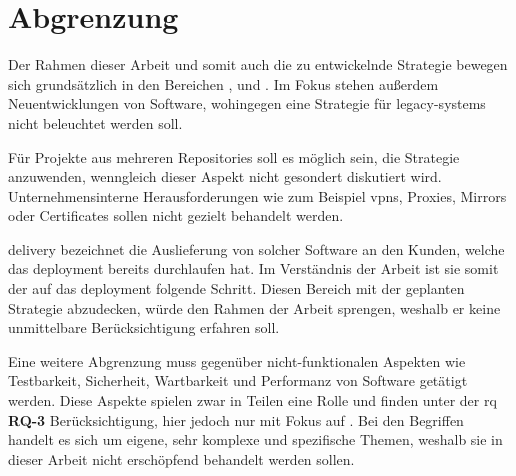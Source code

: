 \section{Abgrenzung}
\label{sec:01-04_demarcation}

Der Rahmen dieser Arbeit und somit auch die zu entwickelnde Strategie bewegen sich grundsätzlich in den Bereichen ,  und . Im Fokus stehen außerdem Neuentwicklungen von Software, wohingegen eine Strategie für \Glspl{legacy-system} nicht beleuchtet werden soll.

Für Projekte aus mehreren Repositories soll es möglich sein, die Strategie anzuwenden, wenngleich dieser Aspekt nicht gesondert diskutiert wird. Unternehmensinterne Herausforderungen wie zum Beispiel \Glspl{vpn}, Proxies, Mirrors oder Certificates sollen nicht gezielt behandelt werden.

\Gls{delivery} bezeichnet die Auslieferung von solcher Software an den Kunden, welche das \Gls{deployment} bereits durchlaufen hat. Im Verständnis der Arbeit ist sie somit der auf das \Gls{deployment} folgende Schritt. Diesen Bereich mit der geplanten Strategie abzudecken, würde den Rahmen der Arbeit sprengen, weshalb er keine unmittelbare Berücksichtigung erfahren soll.

Eine weitere Abgrenzung muss gegenüber nicht-funktionalen Aspekten wie Testbarkeit, Sicherheit, Wartbarkeit und Performanz von Software getätigt werden. Diese Aspekte spielen zwar in Teilen eine Rolle und finden unter der \acrlong{rq} \textbf{RQ-3} Berücksichtigung, hier jedoch nur mit Fokus auf . Bei den Begriffen handelt es sich um eigene, sehr komplexe und spezifische Themen, weshalb sie in dieser Arbeit nicht erschöpfend behandelt werden sollen.
